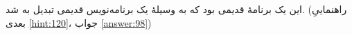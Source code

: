 \section{}
\paragraph{}\label{hint:101}
این یک برنامهٔ قدیمی  بود که به وسیلهٔ یک برنامه‌نویس قدیمی تبدیل به  شد. (راهنماییِ بعدی \ref{hint:120}، جواب \ref{answer:98})